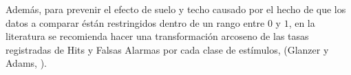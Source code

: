 


Además, para prevenir el efecto de suelo y techo causado por el hecho de que los datos a comparar éstán restringidos dentro de un rango entre $0$ y $1$, en la literatura se recomienda hacer una transformación arcoseno de las tasas registradas de Hits y Falsas Alarmas por cada clase de estímulos, (Glanzer y Adams, \citeyear{Glanzer1990}).\\ 

